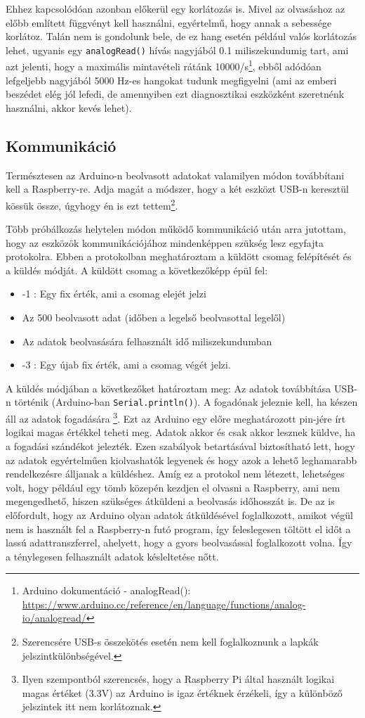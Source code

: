 \documentclass[12pt,a4paper]{article}
\begin{document}
      Ehhez kapcsolódóan azonban előkerül egy korlátozás is. Mivel az olvasáshoz az előbb említett függvényt kell használni, egyértelmű, hogy annak a sebessége korlátoz. Talán nem is gondolunk bele, de ez hang esetén például valós korlátozás lehet, ugyanis egy \texttt{analogRead()} hívás nagyjából 0.1 miliszekundumig tart, ami azt jelenti, hogy a maximális mintavételi rátánk 10000/s\footnote{Arduino dokumentáció - analogRead(): \url{https://www.arduino.cc/reference/en/language/functions/analog-io/analogread/}}, ebből adódóan lefgeljebb nagyjából 5000 Hz-es hangokat tudunk megfigyelni (ami az emberi beszédet elég jól lefedi, de amennyiben ezt diagnosztikai eszközként szeretnénk használni, akkor kevés lehet).

    \subsection{Kommunikáció}
      Természtesen az Arduino-n beolvasott adatokat valamilyen módon továbbítani kell a Raspberry-re. Adja magát a módszer, hogy a két eszközt USB-n keresztül kössük össze, úgyhogy én is ezt tettem\footnote{Szerencsére USB-s összekötés esetén nem kell foglalkoznunk a lapkák jelszintkülönbségével.}.

      Több próbálkozás helytelen módon működő kommunikáció után arra jutottam, hogy az eszközök kommunikációjához mindenképpen szükség lesz egyfajta protokolra. Ebben a protokolban meghatároztam a küldött csomag felépítését és a küldés módját. A küldött csomag a következőképp épül fel:
      \begin{itemize}
        \item -1 : Egy fix érték, ami a csomag elejét jelzi
        \item Az 500 beolvasott adat (időben a legelső beolvasottal legelől)
        \item Az adatok beolvasására felhasznált idő miliszekundumban
        \item -3 : Egy újab fix érték, ami a csomag végét jelzi.
      \end{itemize}
      A küldés módjában a következőket határoztam meg: Az adatok továbbítása USB-n történik (Arduino-ban \texttt{Serial.println()}). A fogadónak jeleznie kell, ha készen áll az adatok fogadására \footnote{Ilyen szempontból szerencsés, hogy a Raspberry Pi által használt logikai magas értéket (3.3V) az Arduino is igaz értéknek érzékeli, így a különböző jelszintek itt nem korlátoznak.}. Ezt az Arduino egy előre meghatározott pin-jére írt logikai magas értékkel teheti meg. Adatok akkor és csak akkor lesznek küldve, ha a fogadási szándékot jelezték.
      Ezen szabályok betartásával biztosítható lett, hogy az adatok egyértelműen kiolvashatók legyenek és hogy azok a lehető leghamarabb rendelkezésre álljanak a küldéshez. Amíg ez a protokol nem létezett, lehetséges volt, hogy például egy tömb közepén kezdjen el olvasni a Raspberry, ami nem megengedhető, hiszen szükséges átküldeni a beolvasás időhosszát is. De az is előfordult, hogy az Arduino olyan adatok átküldésével foglalkozott, amikot végül nem is használt fel a Raspberry-n futó program, így feleslegesen töltött el időt a lassú adattranszferrel, ahelyett, hogy a gyors beolvasással foglalkozott volna. Így a ténylegesen felhasznált adatok késleltetése nőtt.
\end{document}
